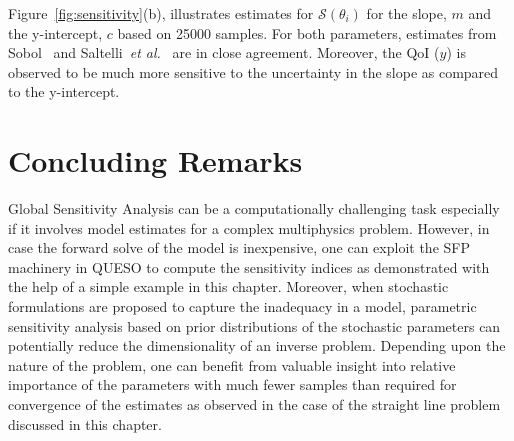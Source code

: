 Figure~\ref{fig:sensitivity}(b), illustrates estimates for $\mathcal{S}(\theta_{i})$ for the slope, $m$ and the
y-intercept, $c$ based on 25000 samples. For both parameters, estimates from Sobol~\cite{Sobol:1990} and
Saltelli~\emph{et al.}~\cite{Saltelli:2010} are in close agreement. Moreover, the QoI ($y$) is observed
to be much more sensitive to the uncertainty in the slope as compared to the y-intercept.

\section{Concluding Remarks}

Global Sensitivity Analysis can be a computationally challenging task especially  if it involves model
estimates for a complex multiphysics problem. However, in case the forward solve of the model is inexpensive, one
can exploit the SFP machinery in QUESO to compute the sensitivity indices as demonstrated with the
help of a simple example in this chapter. Moreover, when stochastic formulations are proposed to
capture the inadequacy in a model, parametric sensitivity analysis based on prior distributions of
the stochastic parameters can potentially reduce the dimensionality of an inverse problem.
Depending upon the nature of the problem, one can benefit from valuable insight into relative
importance of the parameters with much fewer samples than required for convergence of the estimates as
observed in the case of the straight line problem discussed in this chapter.
 



















